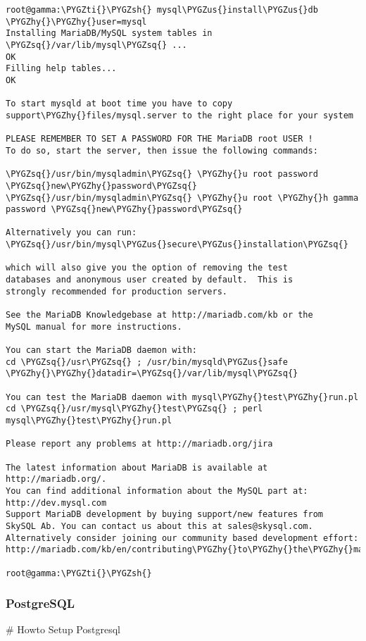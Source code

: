 \documentclass[letterpaper,10pt,english]{sphinxmanual}
\def\PYGZus{\char`\_}
\def\PYGZsh{\char`\#}
\def\PYGZhy{\char`\-}
\def\PYGZsq{\char`\'}
\def\PYGZti{\char`\~}
\begin{document}
\begin{Verbatim}[commandchars=\\\{\}]
root@gamma:\PYGZti{}\PYGZsh{} mysql\PYGZus{}install\PYGZus{}db \PYGZhy{}\PYGZhy{}user=mysql
Installing MariaDB/MySQL system tables in \PYGZsq{}/var/lib/mysql\PYGZsq{} ...
OK
Filling help tables...
OK

To start mysqld at boot time you have to copy
support\PYGZhy{}files/mysql.server to the right place for your system

PLEASE REMEMBER TO SET A PASSWORD FOR THE MariaDB root USER !
To do so, start the server, then issue the following commands:

\PYGZsq{}/usr/bin/mysqladmin\PYGZsq{} \PYGZhy{}u root password \PYGZsq{}new\PYGZhy{}password\PYGZsq{}
\PYGZsq{}/usr/bin/mysqladmin\PYGZsq{} \PYGZhy{}u root \PYGZhy{}h gamma password \PYGZsq{}new\PYGZhy{}password\PYGZsq{}

Alternatively you can run:
\PYGZsq{}/usr/bin/mysql\PYGZus{}secure\PYGZus{}installation\PYGZsq{}

which will also give you the option of removing the test
databases and anonymous user created by default.  This is
strongly recommended for production servers.

See the MariaDB Knowledgebase at http://mariadb.com/kb or the
MySQL manual for more instructions.

You can start the MariaDB daemon with:
cd \PYGZsq{}/usr\PYGZsq{} ; /usr/bin/mysqld\PYGZus{}safe \PYGZhy{}\PYGZhy{}datadir=\PYGZsq{}/var/lib/mysql\PYGZsq{}

You can test the MariaDB daemon with mysql\PYGZhy{}test\PYGZhy{}run.pl
cd \PYGZsq{}/usr/mysql\PYGZhy{}test\PYGZsq{} ; perl mysql\PYGZhy{}test\PYGZhy{}run.pl

Please report any problems at http://mariadb.org/jira

The latest information about MariaDB is available at http://mariadb.org/.
You can find additional information about the MySQL part at:
http://dev.mysql.com
Support MariaDB development by buying support/new features from
SkySQL Ab. You can contact us about this at sales@skysql.com.
Alternatively consider joining our community based development effort:
http://mariadb.com/kb/en/contributing\PYGZhy{}to\PYGZhy{}the\PYGZhy{}mariadb\PYGZhy{}project/

root@gamma:\PYGZti{}\PYGZsh{}
\end{Verbatim}


\subsubsection{PostgreSQL}
\label{sdocs/databases/postgresql/postgresql:postgresql}\label{sdocs/databases/postgresql/postgresql::doc}
\# Howto Setup Postgresql
\end{document}

